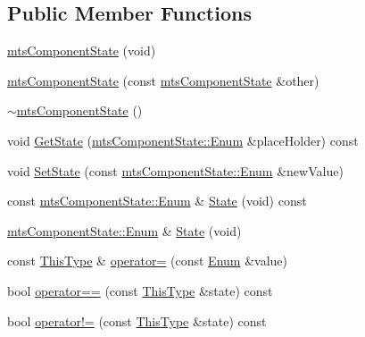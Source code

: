\subsection*{Public Member Functions}
\begin{DoxyCompactItemize}
\item 
\hyperlink{classmts_component_state_a5d94efa3f7027b9609f8be0825e41bb5}{mts\-Component\-State} (void)
\item 
\hyperlink{classmts_component_state_ae9120825a419a33ac088ca55282ebbe5}{mts\-Component\-State} (const \hyperlink{classmts_component_state}{mts\-Component\-State} \&other)
\item 
\hyperlink{classmts_component_state_a0b0f5c15b7e192a2b907f9f0049d6c4b}{$\sim$mts\-Component\-State} ()
\item 
void \hyperlink{classmts_component_state_a3e202dfc34bdd1e78f180dd4444a8e78}{Get\-State} (\hyperlink{classmts_component_state_a1158e4d2d79fff671354909e87f58928}{mts\-Component\-State\-::\-Enum} \&place\-Holder) const 
\item 
void \hyperlink{classmts_component_state_a108ea13e012e621442979fc1c86172ea}{Set\-State} (const \hyperlink{classmts_component_state_a1158e4d2d79fff671354909e87f58928}{mts\-Component\-State\-::\-Enum} \&new\-Value)
\item 
const \hyperlink{classmts_component_state_a1158e4d2d79fff671354909e87f58928}{mts\-Component\-State\-::\-Enum} \& \hyperlink{classmts_component_state_a11adc28d39ad4f73bca5549e05dfa8c5}{State} (void) const 
\item 
\hyperlink{classmts_component_state_a1158e4d2d79fff671354909e87f58928}{mts\-Component\-State\-::\-Enum} \& \hyperlink{classmts_component_state_a6613d98a018b9dd67693345b12109266}{State} (void)
\item 
const \hyperlink{classmts_component_state_a668efaf1bf3c84a5448587f04d7312b5}{This\-Type} \& \hyperlink{classmts_component_state_a7387f2b8e4a75d4b2bfb6a247abba004}{operator=} (const \hyperlink{classmts_component_state_a1158e4d2d79fff671354909e87f58928}{Enum} \&value)
\item 
bool \hyperlink{classmts_component_state_aa8299cf9da4ae26a30061b0a0072f5c3}{operator==} (const \hyperlink{classmts_component_state_a668efaf1bf3c84a5448587f04d7312b5}{This\-Type} \&state) const 
\item 
bool \hyperlink{classmts_component_state_afd18affcda0e1c5d2c258562f7ef016e}{operator!=} (const \hyperlink{classmts_component_state_a668efaf1bf3c84a5448587f04d7312b5}{This\-Type} \&state) const 
\item 

\end{DoxyCompactItemize}
